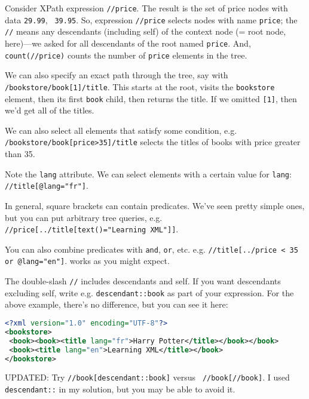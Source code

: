 \documentclass[11pt]{article}
\begin{document}
Consider XPath expression {\tt //price}. The
result is the set of price nodes with data {\tt 29.99}, {\tt
  39.95}. So, expression {\tt //price} selects nodes with name {\tt price};
the {\tt //} means any descendants (including self) of the context node (= root node, here)---we asked for all descendants of the root named {\tt price}.
And, {\tt count(//price)} counts the number of {\tt price} elements
in the tree.

We can also specify an exact path through the tree, say
with {\tt /bookstore/book[1]/title}. This starts at the root,
visits the {\tt bookstore} element, then its first {\tt book} child,
then returns the title. If we omitted {\tt [1]}, then we'd
get all of the titles.

We can also select all elements that satisfy some condition,
e.g. {\tt /bookstore/book[price>35]/title} selects the titles
of books with price greater than 35.

Note the {\tt lang} attribute. We can select elements with a
certain value for {\tt lang}: {\tt //title[@lang="fr"]}.

In general, square brackets can contain predicates. We've 
seen pretty simple ones, but you can put arbitrary tree queries,
e.g. {\tt //price[../title[text()="Learning XML"]]}.

You can also combine predicates with {\tt and}, {\tt or}, etc.
e.g. {\tt //title[../price < 35 or @lang="en"]}. 
{\tt *} works as you might expect.

The double-slash {\tt //} includes descendants and self.
If you want descendants excluding self, write 
e.g. {\tt descendant::book} as part of your expression.
For the above example, there's no difference, but you can see it
here:

\begin{lstlisting}[language=XML]
<?xml version="1.0" encoding="UTF-8"?>
<bookstore>
 <book><book><title lang="fr">Harry Potter</title></book></book>
 <book><title lang="en">Learning XML</title></book>
</bookstore>
\end{lstlisting}

UPDATED: Try {\tt //book[descendant::book]} versus {\tt
  //book[//book]}. I used {\tt descendant::} in my solution, but you
may be able to avoid it.
\end{document}

